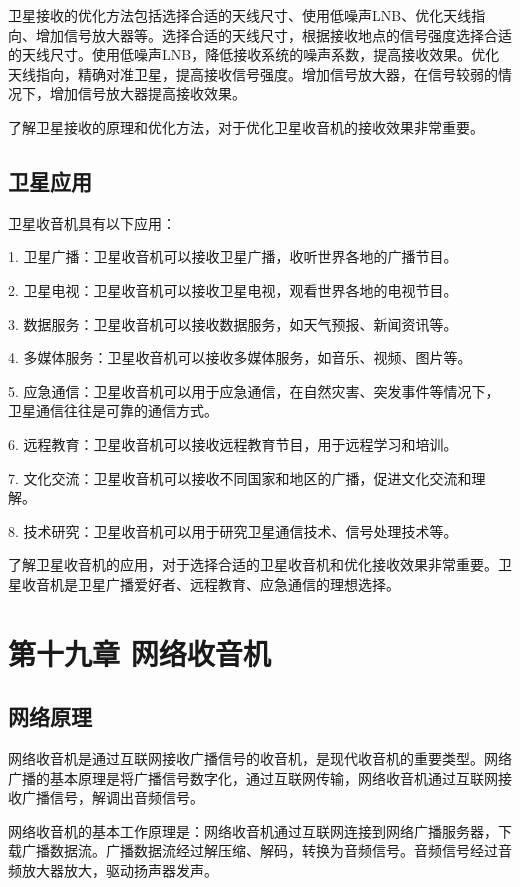 \documentclass[12pt,UTF8]{ctexbook}
\begin{document}
卫星接收的优化方法包括选择合适的天线尺寸、使用低噪声LNB、优化天线指向、增加信号放大器等。选择合适的天线尺寸，根据接收地点的信号强度选择合适的天线尺寸。使用低噪声LNB，降低接收系统的噪声系数，提高接收效果。优化天线指向，精确对准卫星，提高接收信号强度。增加信号放大器，在信号较弱的情况下，增加信号放大器提高接收效果。

了解卫星接收的原理和优化方法，对于优化卫星收音机的接收效果非常重要。

\section{卫星应用}

卫星收音机具有以下应用：

1. 卫星广播：卫星收音机可以接收卫星广播，收听世界各地的广播节目。

2. 卫星电视：卫星收音机可以接收卫星电视，观看世界各地的电视节目。

3. 数据服务：卫星收音机可以接收数据服务，如天气预报、新闻资讯等。

4. 多媒体服务：卫星收音机可以接收多媒体服务，如音乐、视频、图片等。

5. 应急通信：卫星收音机可以用于应急通信，在自然灾害、突发事件等情况下，卫星通信往往是可靠的通信方式。

6. 远程教育：卫星收音机可以接收远程教育节目，用于远程学习和培训。

7. 文化交流：卫星收音机可以接收不同国家和地区的广播，促进文化交流和理解。

8. 技术研究：卫星收音机可以用于研究卫星通信技术、信号处理技术等。

了解卫星收音机的应用，对于选择合适的卫星收音机和优化接收效果非常重要。卫星收音机是卫星广播爱好者、远程教育、应急通信的理想选择。

\chapter{第十九章 网络收音机}

\section{网络原理}

网络收音机是通过互联网接收广播信号的收音机，是现代收音机的重要类型。网络广播的基本原理是将广播信号数字化，通过互联网传输，网络收音机通过互联网接收广播信号，解调出音频信号。

网络收音机的基本工作原理是：网络收音机通过互联网连接到网络广播服务器，下载广播数据流。广播数据流经过解压缩、解码，转换为音频信号。音频信号经过音频放大器放大，驱动扬声器发声。
\end{document}
